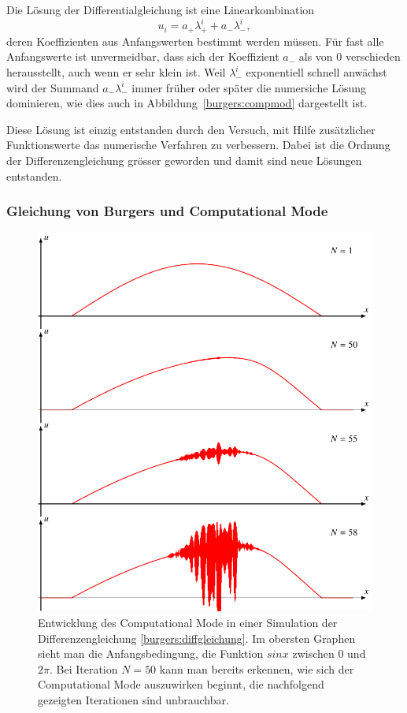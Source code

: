 Die Lösung der Differentialgleichung ist eine Linearkombination
\[
u_i = a_+\lambda_+^i + a_-\lambda_-^i,
\]
deren Koeffizienten aus Anfangswerten bestimmt werden müssen.
Für fast alle Anfangswerte ist unvermeidbar, dass sich der
Koeffizient $a_-$ als von $0$ verschieden herausstellt, auch
wenn er sehr klein ist.
Weil $\lambda_-^i$ exponentiell schnell anwächst wird der Summand
$a_-\lambda_-^i$ immer früher oder später die numersiche Lösung dominieren,
wie dies auch in Abbildung~\ref{burgers:compmod} dargestellt ist.

Diese Lösung ist einzig entstanden durch den Versuch, mit Hilfe zusätzlicher
Funktionswerte das numerische Verfahren zu verbessern.
Dabei ist die Ordnung der Differenzengleichung grösser geworden und damit
sind neue Lösungen entstanden.

\subsubsection{Gleichung von Burgers und Computational Mode}
\begin{figure}
\centering
\includegraphics{learning/burgerwave.pdf}
\caption{Entwicklung des Computational Mode in einer Simulation
der Differenzengleichung \eqref{burgers:diffgleichung}.
Im obersten Graphen sieht man die Anfangsbedingung, die Funktion $sin x$
zwischen $0$ und $2\pi$.
Bei Iteration $N=50$ kann man bereits erkennen, wie sich der Computational
Mode auszuwirken beginnt, die nachfolgend gezeigten Iterationen sind
unbrauchbar.
\label{burgers:burgerwave}}
\end{figure}
